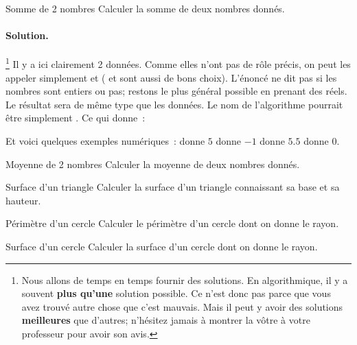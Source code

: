 		\begin{Exercice}{Somme de 2 nombres}
			Calculer la somme de deux nombres donnés.
			\paragraph{Solution.}%
			\footnote{%
				Nous allons de temps en temps 
				fournir des solutions.
				En algorithmique,
				il y a souvent \textbf{plus qu’une} solution possible.
				Ce n’est donc pas parce que vous avez trouvé autre chose
				que c’est mauvais.
				Mais il peut y avoir des solutions \textbf{meilleures}
				que d’autres; 
				n’hésitez jamais à montrer la vôtre
				à votre professeur pour avoir son avis.
			}
			Il y a ici clairement 2 données.
			Comme elles n’ont pas de rôle précis,
			on peut les appeler simplement 
			et 
			( et  sont aussi de bons choix).
			L’énoncé ne dit pas si les nombres sont entiers ou pas;
			restons le plus général possible en prenant des réels.
			Le résultat sera de même type que les données.
			Le nom de l’algorithme pourrait être simplement .
			Ce qui donne~:
			\begin{center}
			\end{center}			 
			Et voici quelques exemples numériques~:	
				 donne $5$      \quad
				 donne $-1$    \quad
				 donne $5.5$  \quad
				 donne $0$.
		\end{Exercice}
	
		\begin{Exercice}{Moyenne de 2 nombres}
			Calculer la moyenne de deux nombres donnés.
		\end{Exercice}
		
		\begin{Exercice}{Surface d’un triangle}
			Calculer la surface d’un triangle connaissant sa base et sa hauteur.
		\end{Exercice}
	
		\begin{Exercice}{Périmètre d’un cercle}
			Calculer le périmètre d’un cercle dont on donne le rayon. 
		\end{Exercice}
	
		\begin{Exercice}{Surface d’un cercle}
			Calculer la surface d’un cercle dont on donne le rayon. 
		\end{Exercice}
	
